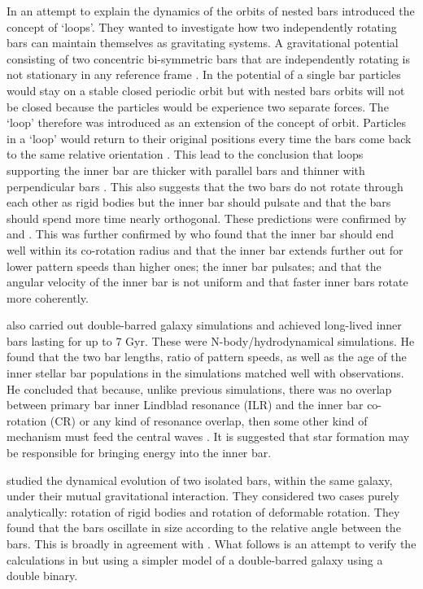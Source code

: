 \documentclass[a4paper,12pt]{article}
\begin{document}
In an attempt to explain the dynamics of the orbits of nested bars \cite{macie7} introduced the concept of `loops'. They wanted to investigate how two independently rotating bars can maintain
themselves as gravitating systems. A gravitational potential consisting of two concentric bi-symmetric bars that are independently rotating is not stationary in any reference frame \citep{macie7}. In the potential
of a single bar particles would stay on a stable closed periodic orbit but with nested bars orbits will not be closed because the particles would be experience two separate forces. The `loop' therefore was
introduced as an extension of the concept of orbit. Particles in a `loop' would return to their original positions every time the bars come back to the same relative orientation \citep{macie7}. This lead to
the conclusion that loops supporting the inner bar are thicker with parallel bars and thinner with perpendicular bars \citep{macie3}. This also suggests that the two bars do not rotate through each other as rigid bodies
but the inner bar should pulsate and that the bars should spend more time nearly orthogonal\citep{macie3}. These predictions were confirmed by \cite{debattista} and \cite{shen1}. 
This was further confirmed by \cite{macie5} who found
that the inner bar should end well within its co-rotation radius and that the inner bar extends further out for lower pattern speeds than higher ones; the inner bar pulsates; and that the angular velocity of the inner
bar is not uniform and that faster inner bars rotate more coherently.

\cite{wozniak} also carried out double-barred galaxy simulations and achieved long-lived inner bars lasting for up to 7 Gyr. These were N-body/hydrodynamical simulations. He found that the two bar lengths, ratio of
pattern speeds, as well as the age of the inner stellar bar populations in the simulations matched well with observations. He concluded that because, unlike previous simulations, there was no overlap between primary bar 
inner Lindblad resonance (ILR) and the inner bar co-rotation (CR) or any kind of resonance overlap, then some other kind of mechanism must feed the central waves \citep{wozniak}. It is suggested that star 
formation may be responsible for bringing energy into the inner bar.

\cite{garzon} studied the dynamical evolution of two isolated bars, within the same galaxy, under their mutual gravitational interaction. They considered two cases purely analytically: rotation of rigid bodies and
rotation of deformable rotation. They found that the bars oscillate in size according to the relative angle between the bars. This is broadly in agreement with \cite{debattista}.
What follows is an attempt to verify the calculations in \cite{garzon} but using a simpler model of a double-barred galaxy using a double binary.
\end{document}
